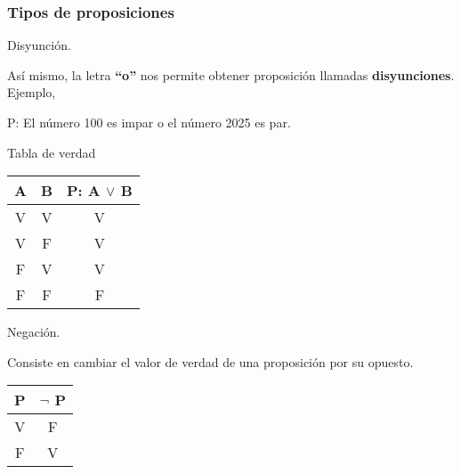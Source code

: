 \documentclass[10pt]{beamer}
\begin{document}
    \begin{frame}
        \frametitle{Tipos de proposiciones}
        Disyunción.

        Así mismo, la letra \textbf{``o''} nos permite obtener proposición llamadas \textbf{disyunciones}.
        Ejemplo,
        \begin{center}
            P: El número 100 es impar o el número 2025 es par.
        \end{center}
        Tabla de verdad
        \begin{center}
            \begin{tabular}{| c | c || c |}
                \hline
                A & B & P: A $\lor$ B \\\hline\hline
                V & V & V\\\hline
                V & F & V\\\hline
                F & V & V\\\hline
                F & F & F\\\hline
            \end{tabular}
        \end{center}

        \vspace{1mm}
        Negación.

        Consiste en cambiar el valor de verdad de una proposición por su opuesto.
        \begin{center}
            \begin{tabular}{| c || c |}
                \hline
                P & $\neg$ P \\\hline\hline
                V & F\\\hline
                F & V\\\hline
            \end{tabular}
        \end{center}

    \end{frame}
\end{document}
